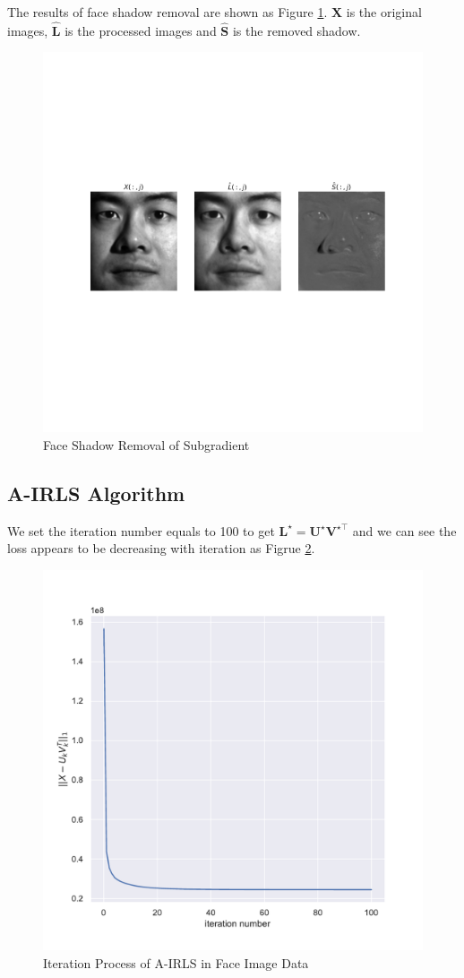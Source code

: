 \documentclass[conference]{IEEEtran}
\begin{document}
The results of face shadow removal are shown as Figure \ref{sub_face1}. $\boldsymbol{X}$ is the original images, $\boldsymbol{\widehat{L}}$ is the processed images and $\boldsymbol{\widehat{S}}$ is the removed shadow. 
\begin{figure}[htbp]
	\centering
	\includegraphics[width=1\linewidth]{image/Figure 6 Subgradient}
	\caption{Face Shadow Removal of Subgradient}
	\label{sub_face1}
\end{figure}

\subsection{A-IRLS Algorithm}
We set the iteration number equals to 100 to get $\boldsymbol{L}^{\star}=\boldsymbol{U}^{\star}\boldsymbol{V}^{\star\top}$ and we can see the loss appears to be decreasing with iteration as Figrue \ref{irls_face1}.
\begin{figure}[htbp]
	\centering
	\includegraphics[width=0.6\linewidth]{image/Figure 7 A-IRLS}
	\caption{Iteration Process of A-IRLS in Face Image Data}
	\label{irls_face1}
\end{figure}
\end{document}

